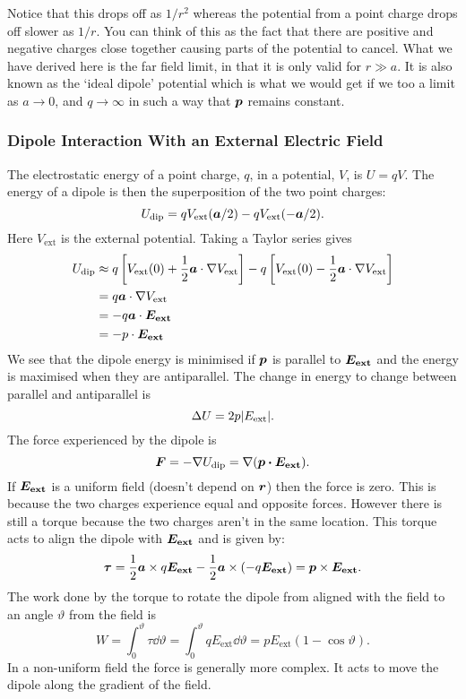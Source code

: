     Notice that this drops off as \(1/r^2\) whereas the potential from a point charge drops off slower as \(1/r\).
    You can think of this as the fact that there are positive and negative charges close together causing parts of the potential to cancel.
    What we have derived here is the far field limit, in that it is only valid for \(r \gg a\).
    It is also known as the `ideal dipole' potential which is what we would get if we too a limit as \(a \to 0\), and \(q\to\infty\) in such a way that \(\bm{p}\) remains constant.
    
    \subsubsection{Dipole Interaction With an External Electric Field}
    The electrostatic energy of a point charge, \(q\), in a potential, \(V\), is \(U = qV\).
    The energy of a dipole is then the superposition of the two point charges:
    \[U_\text{dip} = qV_\text{ext}(\bm{a}/2) - qV_\text{ext}(-\bm{a}/2).\]
    Here \(V_\text{ext}\) is the external potential.
    Taking a Taylor series gives
    \begin{align*}
        U_\text{dip} &\approx q\left[V_\text{ext}(0) + \frac{1}{2}\bm{a}\cdot\nabla V_\text{ext}\right] - q\left[V_\text{ext}(0) - \frac{1}{2}\bm{a}\cdot\nabla V_\text{ext}\right]\\
        &= q\bm{a}\cdot\nabla V_\text{ext}\\
        &= -q\bm{a}\cdot\bm{E_\mathrm{ext}}\\
        &= -p\cdot\bm{E_\mathrm{ext}}
    \end{align*}
    We see that the dipole energy is minimised if \(\bm{p}\) is parallel to \(\bm{E_\mathrm{ext}}\) and the energy is maximised when they are antiparallel.
    The change in energy to change between parallel and antiparallel is
    \[\Delta U = 2p\abs{E_\mathrm{ext}}.\]
    The force experienced by the dipole is
    \[\bm{F} = -\nabla U_\text{dip} = \nabla(\bm{p\cdot\bm{E_\mathrm{ext}}}).\]
    If \(\bm{E_\mathrm{ext}}\) is a uniform field (doesn't depend on \(\bm{r}\)) then the force is zero.
    This is because the two charges experience equal and opposite forces.
    However there is still a torque because the two charges aren't in the same location.
    This torque acts to align the dipole with \(\bm{E_\mathrm{ext}}\) and is given by:
    \[\bm{\tau} = \frac{1}{2}\bm{a}\times q\bm{E_\mathrm{ext}} - \frac{1}{2}\bm{a}\times(-q\bm{E_\mathrm{ext}}) = \bm{p}\times\bm{E_\mathrm{ext}}.\]
    The work done by the torque to rotate the dipole from aligned with the field to an angle \(\vartheta\) from the field is
    \[W = \int_0^\vartheta \tau\dd{\vartheta} = \int_0^\vartheta qE_\mathrm{ext}\dd{\vartheta} = pE_\mathrm{ext}(1 - \cos\vartheta).\]
    In a non-uniform field the force is generally more complex.
    It acts to move the dipole along the gradient of the field.
    
